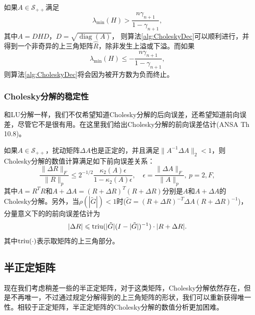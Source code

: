 \documentclass[a4paper,10pt]{ctexart}
\begin{document}
\begin{theorem}\label{th:CholeskyDecSuccess}
    如果$ A\in \mathcal{S}_{++} $满足
    \begin{equation}
        \lambda_{\min}(H) > \frac{n \gamma_{n+1}}{1-\gamma_{n+1}},
    \end{equation}
    其中$ A = DHD $，$ D = \sqrt{\operatorname{diag}(A)} $，
    则算法\ref{alg:CholeskyDec}可以顺利进行，并得到一个非奇异的上三角矩阵$ \hat{R} $，除非发生上溢或下溢。而如果
    \begin{equation}
        \lambda_{\min}(H) \leqslant  -\frac{n \gamma_{n+1}}{1-\gamma_{n+1}},
    \end{equation}
    则算法\ref{alg:CholeskyDec}将会因为被开方数为负而终止。
\end{theorem}

\subsubsection{Cholesky分解的稳定性}
和LU分解一样，我们不仅希望知道Cholesky分解的后向误差，还希望知道前向误差，尽管它不是很有用。在这里我们给出Cholesky分解的前向误差估计(ANSA Th 10.8)。
\begin{theorem}
    如果$ A\in \mathcal{S}_{++} $，扰动矩阵$ \Delta A $也是正定的，并且满足$ \| A^{-1}\Delta A \|_2 < 1 $，则Cholesky分解的数值计算满足如下前向误差关系：
    \begin{equation}
        \frac{\| \Delta R \|_F}{\| R \|_p} \leqslant 2^{-1 / 2} \frac{\kappa_2(A)\epsilon}{1-\kappa_2(A)\epsilon},\quad \epsilon = \frac{\| \Delta A\|_F}{\| A \|_p}, \ p=2,F,
    \end{equation}
    其中$ A = R^TR $和$ A+\Delta A = (R+\Delta R)^T(R+\Delta R) $分别是$ A $和$ A+\Delta A $的Cholesky分解。另外，当$ \rho(|\tilde{G}|)<1 $时($ \tilde{G} = (R+\Delta R)^{-T}\Delta A(R+\Delta R)^{-1} $)，分量意义下的的前向误差估计为
    \begin{equation}
        |\Delta R|\leqslant {\rm triu}(|\tilde{G}|(I-|\tilde{G}|)^{-1})\cdot |R+\Delta R|.
    \end{equation}
    其中$ {\rm triu}(\cdot) $表示取矩阵的上三角部分。
\end{theorem}

\subsection{半正定矩阵}
现在我们考虑稍差一些的半正定矩阵，对于这类矩阵，Cholesky分解依然存在，但是不再唯一，不过通过规定分解得到的上三角矩阵的形状，我们可以重新获得唯一性。相较于正定矩阵，半正定矩阵的Cholesky分解的数值分析更加困难。
\end{document}
